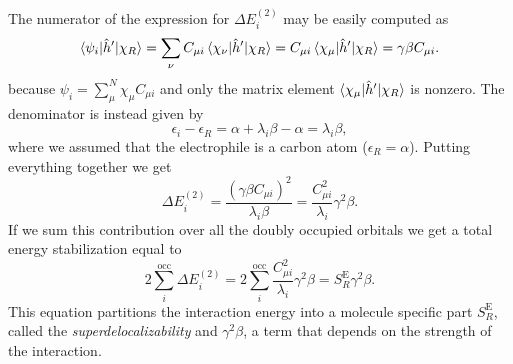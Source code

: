 \documentclass[../Main/chem532-notes.tex]{subfiles}
\begin{document}
The numerator of the expression for $\Delta E_i^{(2)}$ may be easily computed as
\begin{equation}
\braket{\psi_i|\hat{h}'|\chi_R} =\sum_\nu C_{\mu i} \braket{\chi_\nu|\hat{h}'|\chi_R}
 = C_{\mu i} \braket{\chi_\mu|\hat{h}'|\chi_R} = \gamma \beta C_{\mu i}.
\end{equation}
because $\psi_i = \sum_\mu^{N} \chi_\mu C_{\mu i}$ and only the matrix element $ \braket{\chi_\mu|\hat{h}'|\chi_R}$ is nonzero.
The denominator is instead given by
\begin{equation}
\epsilon_i - \epsilon_R = \alpha + \lambda_i \beta - \alpha = \lambda_i \beta,
\end{equation}
where we assumed that the electrophile is a carbon atom ($\epsilon_R = \alpha$).
Putting everything together we get
\begin{equation}
\Delta E_i^{(2)} = \frac{(\gamma \beta C_{\mu i})^2}{\lambda_i \beta} = \frac{C_{\mu i}^2}{\lambda_i} \gamma^2 \beta.
\end{equation}
If we sum this contribution over all the doubly occupied orbitals we get a total energy stabilization equal to 
\begin{equation}
2 \sum_i^\text{occ} \Delta E_i^{(2)} = 2 \sum_i^\text{occ} \frac{C_{\mu i}^2}{\lambda_i} \gamma^2 \beta
= S_R^\mathrm{E} \gamma^2 \beta.
\end{equation}
This equation partitions the interaction energy into a molecule specific part $S_R^\mathrm{E}$, called the \textit{superdelocalizability} and $\gamma^2 \beta$, a term that depends on the strength of the interaction.
\end{document}
